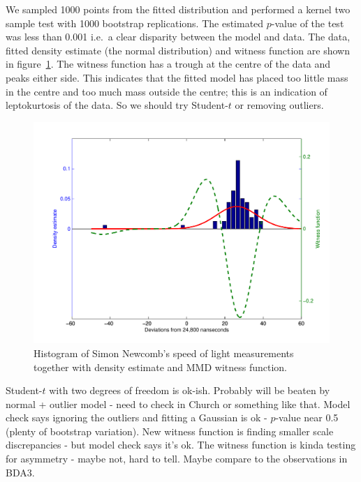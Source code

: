\documentclass{article}
\def\ie{i.e.\ }
\begin{document}
We sampled 1000 points from the fitted distribution and performed a kernel two sample test with 1000 bootstrap replications.
The estimated $p$-value of the test was less than 0.001 \ie a clear disparity between the model and data.
The data, fitted density estimate (the normal distribution) and witness function are shown in figure~\ref{fig:newcomb_witness_1}.
The witness function has a trough at the centre of the data and peaks either side.
This indicates that the fitted model has placed too little mass in the centre and too much mass outside the centre; this is an indication of leptokurtosis of the data.
So we should try Student-$t$ or removing outliers.

\begin{figure}[ht]
\centering
\includegraphics[width=0.98\columnwidth]{figures/newcomb_witness_1}
\caption{
Histogram of Simon Newcomb's speed of light measurements together with density estimate and MMD witness function.
}
\label{fig:newcomb_witness_1}
\end{figure}

Student-$t$ with two degrees of freedom is ok-ish.
Probably will be beaten by normal + outlier model - need to check in Church or something like that.
Model check says ignoring the outliers and fitting a Gaussian is ok - $p$-value near 0.5 (plenty of bootstrap variation).
New witness function is finding smaller scale discrepancies - but model check says it's ok.
The witness function is kinda testing for asymmetry - maybe not, hard to tell.
Maybe compare to the observations in BDA3.
\end{document}
